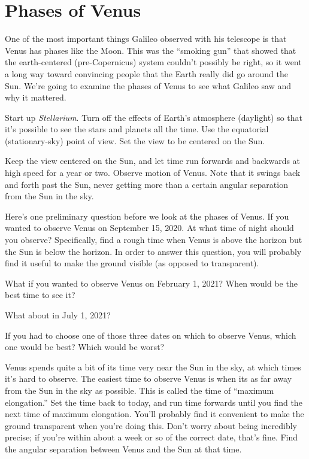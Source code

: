 \section{Phases of Venus}


One of the most important things Galileo observed with his telescope is that
Venus has phases like the Moon.   This was the ``smoking gun'' that showed
that the earth-centered (pre-Copernicus) system couldn't possibly be right,
so it went a long way toward convincing people that the Earth really did
go around the Sun.  We're going to examine the phases of Venus to see what
Galileo saw and why it mattered. 

Start up \textit{Stellarium}.
Turn off 
the effects of Earth's atmosphere (daylight)
so that it's possible to see the stars and planets all the time.
Use the equatorial (stationary-sky) point of view.
Set the view to be centered on the Sun.

Keep the view centered on the Sun, and let time run forwards and backwards 
at high speed for a year or two.
Observe
motion of Venus.  Note that it swings back and forth past the Sun,
never getting more than a certain angular separation from the Sun in the sky. 

Here's one preliminary question before we look at the phases of Venus.
If you wanted to observe Venus on September 15, 2020.
At what time of night should you
observe?  Specifically, find a rough time when Venus is above the
horizon but the Sun is below the horizon. In order to answer this
question, you will probably find it useful to make the ground visible (as
opposed to
transparent).



\answerspace{0.7in}

What if you wanted to observe Venus on February 1, 2021? When would be the
best time to see it?

\answerspace{ 0.7in}

What about in July 1, 2021?

\answerspace{ 0.7in}


If you had to choose one of those three dates on which to observe
Venus, which one would be best? Which would be worst?

\answerspace{ 0.7in}

Venus spends quite a bit of its time very near the Sun in the sky,
at which times it's hard to observe.
The easiest time to observe Venus is when its as far away from
the Sun in the sky as possible.  This is called the time of ``maximum
elongation.''  Set the time back to today, 
and run time forwards until you find the next time of maximum
elongation. You'll probably find it convenient to make the ground transparent
when you're doing this.
Don't worry about being incredibly precise; if you're
within about a week or so of the correct date, that's fine.
Find the angular
separation between
Venus and the Sun at that time. 

